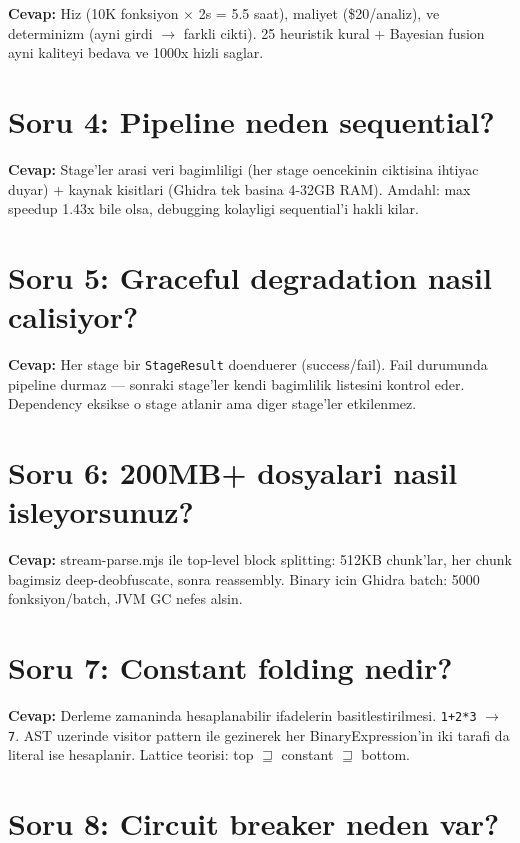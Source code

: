 \documentclass[12pt,a4paper,oneside]{book}
\theoremstyle{definition}
\newcommand{\code}[1]{\texttt{\color{green!60!white}#1}}
\begin{document}
\textbf{Cevap:} Hiz (10K fonksiyon $\times$ 2s = 5.5 saat), maliyet (\$20/analiz), ve determinizm (ayni girdi $\to$ farkli cikti). 25 heuristik kural + Bayesian fusion ayni kaliteyi bedava ve 1000x hizli saglar.

\section{Soru 4: Pipeline neden sequential?}

\textbf{Cevap:} Stage'ler arasi veri bagimliligi (her stage oencekinin ciktisina ihtiyac duyar) + kaynak kisitlari (Ghidra tek basina 4-32GB RAM). Amdahl: max speedup 1.43x bile olsa, debugging kolayligi sequential'i hakli kilar.

\section{Soru 5: Graceful degradation nasil calisiyor?}

\textbf{Cevap:} Her stage bir \code{StageResult} doenduerer (success/fail). Fail durumunda pipeline durmaz --- sonraki stage'ler kendi bagimlilik listesini kontrol eder. Dependency eksikse o stage atlanir ama diger stage'ler etkilenmez.

\section{Soru 6: 200MB+ dosyalari nasil isle\-yorsunuz?}

\textbf{Cevap:} stream-parse.mjs ile top-level block splitting: 512KB chunk'lar, her chunk bagimsiz deep-deobfuscate, sonra reassembly. Binary icin Ghidra batch: 5000 fonksiyon/batch, JVM GC nefes alsin.

\section{Soru 7: Constant folding nedir?}

\textbf{Cevap:} Derleme zamaninda hesaplanabilir ifadelerin basitlestirilmesi. \code{1+2*3} $\to$ \code{7}. AST uzerinde visitor pattern ile gezinerek her BinaryExpression'in iki tarafi da literal ise hesaplanir. Lattice teorisi: top $\sqsupseteq$ constant $\sqsupseteq$ bottom.

\section{Soru 8: Circuit breaker neden var?}
\end{document}
